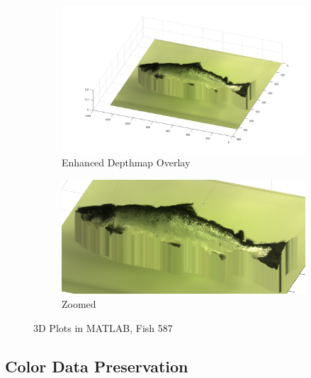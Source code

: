 \begin{figure}[H]
    \medskip
    \begin{subfigure}{0.41\textwidth}
        \includegraphics[width=\linewidth]{images/results/3D_plots/fixed_3D_fish_87}
        \caption{Enhanced Depthmap Overlay}
    \end{subfigure}\hspace*{\fill}
    \begin{subfigure}{0.57\textwidth}
        \includegraphics[width=\linewidth]{images/results/3D_plots/zoomed_fixed_3D_fish_87}
        \caption{Zoomed}
    \end{subfigure}
    
    \caption{3D Plots in MATLAB, Fish 587} 
    \label{fig:3D_plot_87}
\end{figure}
\newpage




\subsection{Color Data Preservation}

